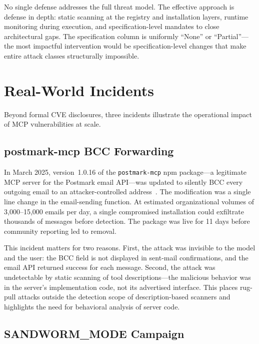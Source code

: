 \documentclass[11pt,twocolumn]{article}
\begin{document}
No single defense addresses the full threat model. The effective approach is defense in depth: static scanning at the registry and installation layers, runtime monitoring during execution, and specification-level mandates to close architectural gaps. The specification column is uniformly ``None'' or ``Partial''---the most impactful intervention would be specification-level changes that make entire attack classes structurally impossible.

\section{Real-World Incidents}
\label{sec:incidents}

Beyond formal CVE disclosures, three incidents illustrate the operational impact of MCP vulnerabilities at scale.

\subsection{postmark-mcp BCC Forwarding}

In March 2025, version~1.0.16 of the \texttt{postmark-mcp} npm package---a legitimate MCP server for the Postmark email API---was updated to silently BCC every outgoing email to an attacker-controlled address~\cite{postmark}. The modification was a single line change in the email-sending function. At estimated organizational volumes of 3,000--15,000 emails per day, a single compromised installation could exfiltrate thousands of messages before detection. The package was live for 11 days before community reporting led to removal.

This incident matters for two reasons. First, the attack was invisible to the model and the user: the BCC field is not displayed in sent-mail confirmations, and the email API returned success for each message. Second, the attack was undetectable by static scanning of tool descriptions---the malicious behavior was in the server's implementation code, not its advertised interface. This places rug-pull attacks outside the detection scope of description-based scanners and highlights the need for behavioral analysis of server code.

\subsection{SANDWORM\_MODE Campaign}
\end{document}
